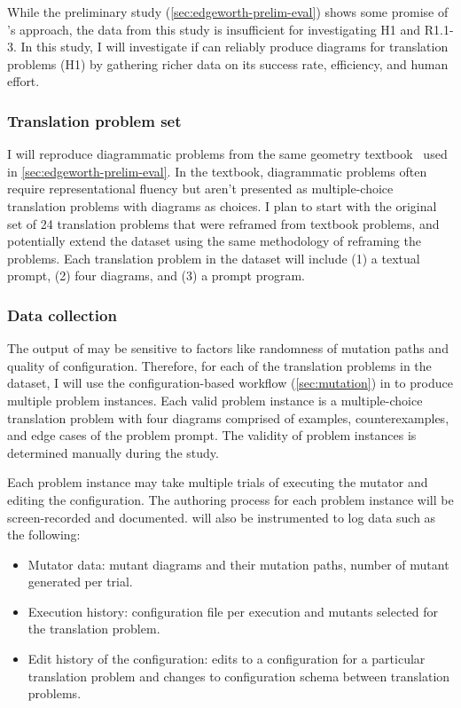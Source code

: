 While the preliminary study (\cref{sec:edgeworth-prelim-eval}) shows some promise of \Edgeworth's approach, the data from this study is insufficient for investigating H1 and R1.1-3. In this study, I will investigate if \Edgeworth can reliably produce diagrams for translation problems (H1) by gathering richer data on its success rate, efficiency, and human effort. 

\subsubsection{Translation problem set} 

I will reproduce diagrammatic problems from the same geometry textbook~\cite{holtGeometry} used in \cref{sec:edgeworth-prelim-eval}. In the textbook, diagrammatic problems often require representational fluency but aren't presented as multiple-choice translation problems with diagrams as choices. I plan to start with the original set of 24 translation problems that were reframed from textbook problems, and potentially extend the dataset using the same methodology of reframing the problems. Each translation problem in the dataset will include (1) a textual prompt, (2) four diagrams, and (3) a \Substance prompt program.

\subsubsection{Data collection} 

The output of \Edgeworth may be sensitive to factors like randomness of mutation paths and quality of configuration. Therefore, for each of the translation problems in the dataset, I will use the configuration-based workflow (\cref{sec:mutation}) in \Edgeworth to produce multiple problem instances. Each valid problem instance is a multiple-choice translation problem with four diagrams comprised of examples, counterexamples, and edge cases of the problem prompt. The validity of problem instances is determined manually during the study. 

Each problem instance may take multiple trials of executing the mutator and editing the configuration. The authoring process for each problem instance will be screen-recorded and documented. \Edgeworth will also be instrumented to log data such as the following:

\begin{itemize}
    \item Mutator data: mutant diagrams and their mutation paths, number of mutant generated per trial.
    \item Execution history: configuration file per execution and mutants selected for the translation problem.
    \item Edit history of the configuration: edits to a configuration for a particular translation problem and changes to configuration schema between translation problems.
\end{itemize}

